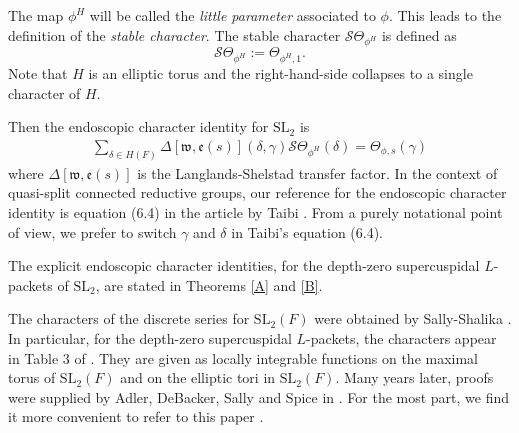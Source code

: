 \documentclass[11pt]{amsart}
\numberwithin{equation}{section}
\def\fe{\mathfrak{e}}
\def\fw{\mathfrak{w}}
\def\SL{\mathrm{SL}}
\newcommand{\sS}{\mathscr{S}}
\newcommand{\<}{\left\langle}
\renewcommand{\>}{\right\rangle}
\begin{document}
        
       The map $\phi^H$ will be called the  \emph{little parameter} associated to $\phi$.   This  leads to the definition of the \emph{stable character}.   
 The stable character $\sS\Theta_{\phi^H}$ is defined as 
 \[
 \sS\Theta_{\phi^H} := \Theta_{\phi^H, 1}.
 \] 
 Note that $H$ is an elliptic torus and the right-hand-side collapses to a single character of $H$. 
 
Then the  endoscopic character identity for $\SL_2$ is     
\begin{eqnarray}\label{endo}
 \sum_{\delta \in H(F)} \Delta[\fw,\fe(s)](\delta, \gamma) \sS\Theta_{\phi^H}(\delta) = \Theta_{\phi,s}(\gamma) 
\end{eqnarray}       
where $\Delta[\fw,\fe(s)]$ is the Langlands-Shelstad transfer factor.
 In the context of quasi-split connected reductive groups, our reference for the endoscopic character identity is equation (6.4) in the article by Taibi \cite{T}.       
  From a purely notational point of view, we prefer to switch $\gamma$ and $\delta$ in Taibi's equation (6.4).
 
 
    


 The explicit endoscopic character identities, for the depth-zero supercuspidal $L$-packets of $\SL_2$, are stated in Theorems \ref{A} and \ref{B}.     




The characters of the discrete series for $\SL_2(F)$  were obtained by Sally-Shalika \cite{SS}.     In particular, for the depth-zero supercuspidal $L$-packets, the characters 
appear in Table 3 of \cite{SS}.  They are given as locally integrable functions on the maximal torus of $\SL_2(F)$ and on the elliptic tori in $\SL_2(F)$.   Many years later, proofs were supplied by  Adler, DeBacker, Sally and Spice in \cite{ADSS}.   For the most part, we find it more convenient to refer to this paper  \cite{ADSS}. 
\end{document}
